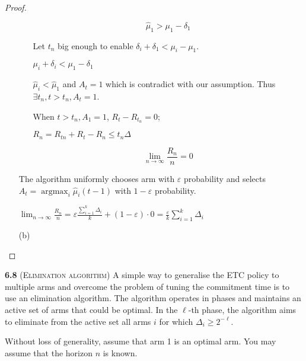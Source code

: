 \begin{proof}
\begin{enumerate}
\begin{enumerate}
            $$
            \hat \mu_1 > \mu_1 - \delta_1
            $$
        
            Let $t_n$ big enough to enable $\delta_i + \delta_1 < \mu_i - \mu_1$.
        
            $\mu_i + \delta_i < \mu_1 - \delta_1$
        
            $\hat \mu_i < \hat \mu_1$ and   $A_t = 1$ which is contradict with our assumption. Thus $\exists t_n, t > t_n, A_t = 1$.
        
            When $t > t_n, A_1 = 1$, $R_t - R_{t_n} = 0$;
        
            
            $R_n = R_{tn} + {R_t - R_n} \leq t_n \Delta$
        
            $$
            \lim _{n \rightarrow \infty} \frac{R_{n}}{n}=0
            $$
        \end{enumerate}
        
        The algorithm uniformly chooses arm with $\varepsilon$ probability and selects $A_{t}=\operatorname{argmax}_{i} \hat{\mu}_{i}(t-1)$ with $1 - \varepsilon$ probability.
    
        $\lim _{n \rightarrow \infty} \frac{R_{n}}{n}={\varepsilon}  \frac{\sum_{i=1}^{k} \Delta_{i}} {k} + \left(1 - \varepsilon\right) \cdot 0 = \frac{\varepsilon}{k} \sum_{i=1}^{k} \Delta_{i}$
    \item [(b)]
\end{enumerate}
\end{proof}



\noindent\textbf{6.8} (\textsc{Elimination algorithm})
A simple way to generalise the ETC policy to multiple arms and overcome the problem of tuning the commitment time is to use an elimination algorithm.
The algorithm operates in phases and maintains an active set of arms that could be optimal.
In the $\ell$-th phase, the algorithm aims to eliminate from the active set all arms $i$ for which $\Delta_{i} \geq 2^{-\ell}$.

Without loss of generality, assume that arm 1 is an optimal arm.
You may assume that the horizon $n$ is known.

